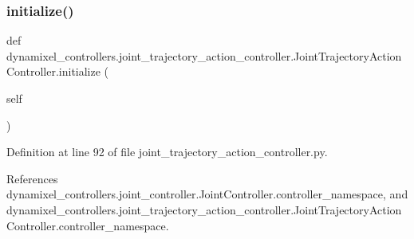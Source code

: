 \subsubsection{\texorpdfstring{initialize()}{initialize()}}
{\footnotesize\ttfamily def dynamixel\+\_\+controllers.\+joint\+\_\+trajectory\+\_\+action\+\_\+controller.\+Joint\+Trajectory\+Action\+Controller.\+initialize (\begin{DoxyParamCaption}\item[{}]{self }\end{DoxyParamCaption})}



Definition at line 92 of file joint\+\_\+trajectory\+\_\+action\+\_\+controller.\+py.



References dynamixel\+\_\+controllers.\+joint\+\_\+controller.\+Joint\+Controller.\+controller\+\_\+namespace, and dynamixel\+\_\+controllers.\+joint\+\_\+trajectory\+\_\+action\+\_\+controller.\+Joint\+Trajectory\+Action\+Controller.\+controller\+\_\+namespace.


